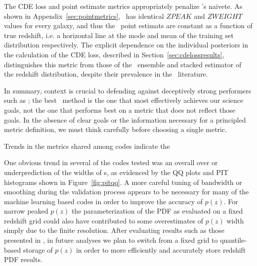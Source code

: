 The CDE loss and point estimate metrics appropriately penalize \trainz's naivete.
As shown in Appendix~\ref{sec:pointmetrics}, \trainz ~has identical $ZPEAK$ and $ZWEIGHT$ values for every galaxy, and thus the \pz\ point estimats are constant as a function of true redshift, i.e. a horizontal line at the mode and mean of the training set distribution respectively.
The explicit dependence on the individual posteriors in the calculation of the CDE loss, described in Section~\ref{sec:cdelossresults}, distinguishes this metric from those of the \pzpdf\ ensemble and stacked estimator of the redshift distribution, despite their prevalence in the \pz\ literature.

In summary, context is crucial to defending against deceptively strong performers such as \trainz; the best \pzpdf\ method is the one that most effectively achieves our science goals, not the one that performs best on a metric that does not reflect those goals.
In the absence of clear goals or the information necessary for a principled metric definition, we must think carefully before choosing a single metric.

Trends in the metrics shared among codes indicate the

One obvious trend in several of the codes tested was an overall over or underprediction of the widths of \pzpdf s, as evidenced by the QQ plots and PIT histograms shown in Figure~\ref{fig:pitqq}.
A more careful tuning of bandwidth or smoothing during the validation process appears to be necessary for many of the machine learning based codes in order to improve the accuracy of $p(z)$.
For narrow peaked $p(z)$ the parameterization of the PDF as evaluated on a fixed redshift grid could also have contributed to some overestimates of $p(z)$ width simply due to the finite resolution.
After evaluating results such as those presented in \citet[]{Malz:qp}, in future analyses we plan to switch from a fixed grid to quantile-based storage of $p(z)$ in order to more efficiently and accurately store redshift PDF results.

